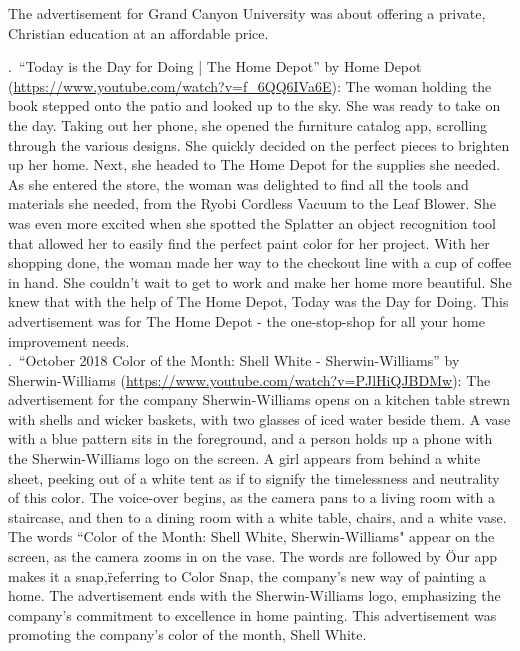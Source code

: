     The advertisement for Grand Canyon University was about offering a private, Christian education at an affordable price.


    .~``Today is the Day for Doing | The Home Depot'' by Home Depot (\url{https://www.youtube.com/watch?v=f_6QQ6IVa6E}): The woman holding the book stepped onto the patio and looked up to the sky. She was ready to take on the day. Taking out her phone, she opened the furniture catalog app, scrolling through the various designs. She quickly decided on the perfect pieces to brighten up her home. Next, she headed to The Home Depot for the supplies she needed. As she entered the store, the woman was delighted to find all the tools and materials she needed, from the Ryobi Cordless Vacuum to the Leaf Blower. She was even more excited when she spotted the Splatter an object recognition tool that allowed her to easily find the perfect paint color for her project. With her shopping done, the woman made her way to the checkout line with a cup of coffee in hand. She couldn't wait to get to work and make her home more beautiful. She knew that with the help of The Home Depot, Today was the Day for Doing. This advertisement was for The Home Depot - the one-stop-shop for all your home improvement needs. \\


    

    .~``October 2018 Color of the Month: Shell White - Sherwin-Williams'' by Sherwin-Williams (\url{https://www.youtube.com/watch?v=PJlHiQJBDMw}): The advertisement for the company Sherwin-Williams opens on a kitchen table strewn with shells and wicker baskets, with two glasses of iced water beside them. A vase with a blue pattern sits in the foreground, and a person holds up a phone with the Sherwin-Williams logo on the screen. A girl appears from behind a white sheet, peeking out of a white tent as if to signify the timelessness and neutrality of this color. The voice-over begins, as the camera pans to a living room with a staircase, and then to a dining room with a white table, chairs, and a white vase. The words ``Color of the Month: Shell White, Sherwin-Williams" appear on the screen, as the camera zooms in on the vase. The words are followed by \"Our app makes it a snap,\" referring to Color Snap, the company's new way of painting a home. The advertisement ends with the Sherwin-Williams logo, emphasizing the company's commitment to excellence in home painting. This advertisement was promoting the company's color of the month, Shell White. \\

